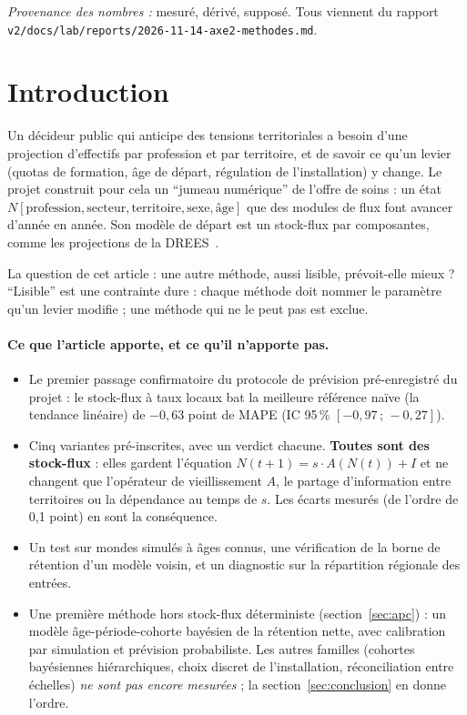 \documentclass[11pt]{article}
\begin{document}
\medskip
\noindent\textit{Provenance des nombres :} \mesure{} mesuré, \derive{} dérivé, \suppose{} supposé.
Tous viennent du rapport \texttt{v2/docs/lab/reports/2026-11-14-axe2-methodes.md}.

\section{Introduction}
Un décideur public qui anticipe des tensions territoriales a besoin d'une projection d'effectifs par
profession et par territoire, et de savoir ce qu'un levier (quotas de formation, âge de départ,
régulation de l'installation) y change. Le projet construit pour cela un \enquote{jumeau numérique} de
l'offre de soins : un état $N[\text{profession}, \text{secteur}, \text{territoire}, \text{sexe}, \text{âge}]$
que des modules de flux font avancer d'année en année. Son modèle de départ est un stock-flux par
composantes, comme les projections de la DREES~\cite{drees2021dd76}.

La question de cet article : une autre méthode, aussi lisible, prévoit-elle mieux ? \enquote{Lisible}
est une contrainte dure : chaque méthode doit nommer le paramètre qu'un levier modifie ; une méthode qui
ne le peut pas est exclue.

\paragraph{Ce que l'article apporte, et ce qu'il n'apporte pas.}
\begin{itemize}
  \item Le premier passage confirmatoire du protocole de prévision pré-enregistré du projet : le
        stock-flux à taux locaux bat la meilleure référence naïve (la tendance linéaire) de
        $-0{,}63$\mesure{} point de MAPE (IC 95\,\% $[-0{,}97\,;\,-0{,}27]$\mesure).
  \item Cinq variantes pré-inscrites, avec un verdict chacune. \textbf{Toutes sont des stock-flux} :
        elles gardent l'équation $N(t+1) = s \cdot A(N(t)) + I$ et ne changent que l'opérateur de
        vieillissement $A$, le partage d'information entre territoires ou la dépendance au temps de $s$.
        Les écarts mesurés (de l'ordre de 0,1\mesure{} point) en sont la conséquence.
  \item Un test sur mondes simulés à âges connus, une vérification de la borne de rétention d'un modèle
        voisin, et un diagnostic sur la répartition régionale des entrées.
  \item Une première méthode hors stock-flux déterministe (section~\ref{sec:apc}) : un modèle
        âge-période-cohorte bayésien de la rétention nette, avec calibration par simulation et prévision
        probabiliste. Les autres familles (cohortes bayésiennes hiérarchiques, choix discret de
        l'installation, réconciliation entre échelles) \emph{ne sont pas encore mesurées} ; la
        section~\ref{sec:conclusion} en donne l'ordre.
\end{itemize}
\end{document}
